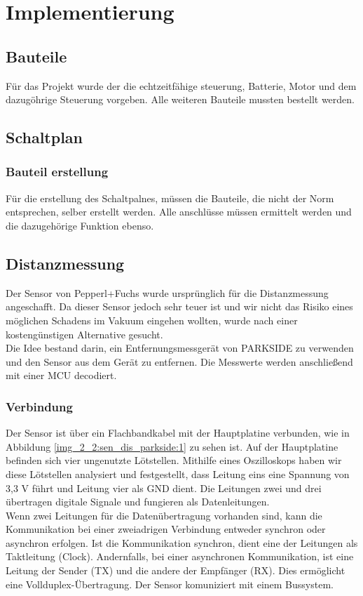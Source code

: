 \chapter{Implementierung}

\section{Bauteile}

Für das Projekt wurde der die echtzeitfähige steuerung, Batterie,  Motor und dem dazugöhrige Steuerung vorgeben.  Alle weiteren Bauteile mussten bestellt werden. 

\section{Schaltplan}


\subsection{Bauteil erstellung}

Für die erstellung des Schaltpalnes, müssen die Bauteile, die nicht der Norm entsprechen, selber erstellt werden. Alle anschlüsse müssen ermittelt werden und die dazugehörige Funktion ebenso.


\section{Distanzmessung}

Der Sensor von Pepperl+Fuchs wurde ursprünglich für die Distanzmessung angeschafft. Da dieser Sensor jedoch sehr teuer ist und wir nicht das Risiko eines möglichen Schadens im Vakuum eingehen wollten, wurde nach einer kostengünstigen Alternative gesucht.\\
Die Idee bestand darin, ein Entfernungsmessgerät von PARKSIDE zu verwenden und den Sensor aus dem Gerät zu entfernen. Die Messwerte werden anschließend mit einer MCU decodiert.

\subsection{Verbindung}
Der Sensor ist über ein Flachbandkabel mit der Hauptplatine verbunden, wie in Abbildung \ref{img_2_2:sen_dis_parkside:1} zu sehen ist. Auf der Hauptplatine befinden sich vier ungenutzte Lötstellen. Mithilfe eines Oszilloskops haben wir diese Lötstellen analysiert und festgestellt, dass Leitung eins eine Spannung von 3,3 V führt und Leitung vier als GND dient. Die Leitungen zwei und drei übertragen digitale Signale und fungieren als Datenleitungen.\\
Wenn zwei Leitungen für die Datenübertragung vorhanden sind, kann die Kommunikation bei einer zweiadrigen Verbindung entweder synchron oder asynchron erfolgen. Ist die Kommunikation synchron, dient eine der Leitungen als Taktleitung (Clock). Andernfalls, bei einer asynchronen Kommunikation, ist eine Leitung der Sender (TX) und die andere der Empfänger (RX). Dies ermöglicht eine Vollduplex-Übertragung.
Der Sensor komuniziert mit einem Bussystem.




